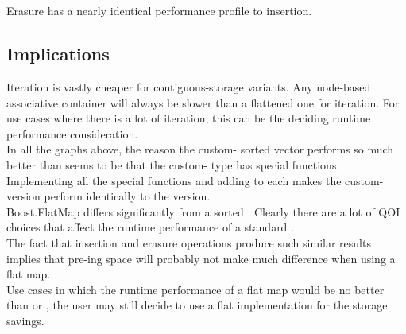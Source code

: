 \\
\\


Erasure has a nearly identical performance profile to insertion.\\


\subsection{Implications}

Iteration is vastly cheaper for contiguous-storage variants.  Any node-based
associative container will always be slower than a flattened one for
iteration.  For use cases where there is a lot of iteration, this can be the
deciding runtime performance consideration.\\

In all the graphs above, the reason the custom- sorted vector
performs so much better than  seems to be that
the custom- type has  special functions.
Implementing all the special functions and adding  to
each makes the custom- version perform identically to the
 version.\\

Boost.FlatMap differs significantly from a sorted .  Clearly
there are a lot of QOI choices that affect the runtime performance of a
standard .\\

The fact that insertion and erasure operations produce such similar results
implies that pre-ing space will probably not make much
difference when using a flat map.\\

Use cases in which the runtime performance of a flat map would be no better
than  or , the user may still decide to use a
flat implementation for the storage savings.
